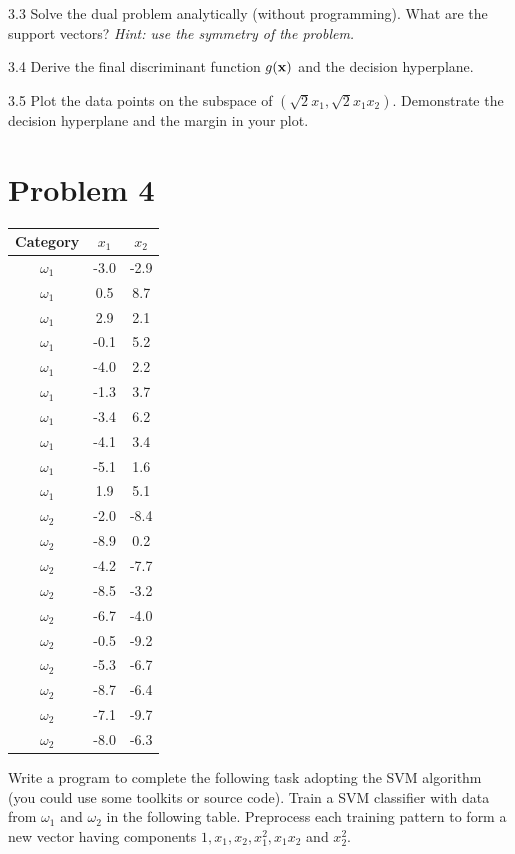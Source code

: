 \documentclass{article}
\theoremstyle{definition}
\theoremstyle{definition}
\theoremstyle{remark}
\begin{document}
3.3 Solve the dual problem analytically (without programming). What are the support vectors? \emph{Hint: use the symmetry of the problem.}

3.4 Derive the final discriminant function $g(\bf{x})$ and the decision hyperplane.

3.5 Plot the data points on the subspace of $(\sqrt{2}x_1, \sqrt{2}x_1x_2)$. Demonstrate the decision hyperplane and the margin in your plot.


\section*{Problem 4}

\begin{table}[!ht]
	\centering
	\begin{tabular}{|c|c|c|}
		\hline
		Category & $x_1$ & $x_2$\\
		\hline
		$\omega_1$ & -3.0 & -2.9\\
		$\omega_1$ & 0.5 & 8.7\\
		$\omega_1$ & 2.9 & 2.1\\
		$\omega_1$ & -0.1 & 5.2\\
		$\omega_1$ & -4.0 & 2.2\\
		$\omega_1$ & -1.3 & 3.7\\
		$\omega_1$ & -3.4 & 6.2\\
		$\omega_1$ & -4.1 & 3.4\\
		$\omega_1$ & -5.1 & 1.6\\
		$\omega_1$ & 1.9 & 5.1\\
		\hline
		$\omega_2$ & -2.0 & -8.4\\
		$\omega_2$ & -8.9 & 0.2\\
		$\omega_2$ & -4.2 & -7.7\\
		$\omega_2$ & -8.5 & -3.2\\
		$\omega_2$ & -6.7 & -4.0\\
		$\omega_2$ & -0.5 & -9.2\\
		$\omega_2$ & -5.3 & -6.7\\
		$\omega_2$ & -8.7 & -6.4\\
		$\omega_2$ & -7.1 & -9.7\\
		$\omega_2$ & -8.0 & -6.3\\
		\hline
	\end{tabular}
\end{table}

Write a program to complete the following task adopting the SVM algorithm (you could use some toolkits or source code). Train a SVM classifier with data from $\omega_1$ and $\omega_2$ in the following table. Preprocess each training pattern to form a new vector having components $1,x_1,x_2,x_1^2,x_1x_2$ and $ x_2^2$.
\end{document}
